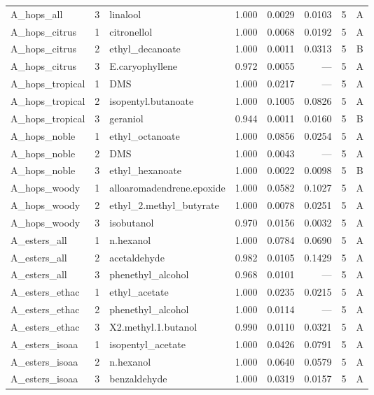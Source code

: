 \begin{longtable}{@{}p{} r p{} r r r r c@{}}
A\_hops\_all & 3 & linalool & 1.000 & 0.0029 & 0.0103 & 5 & A \\
A\_hops\_citrus & 1 & citronellol & 1.000 & 0.0068 & 0.0192 & 5 & A \\
A\_hops\_citrus & 2 & ethyl\_decanoate & 1.000 & 0.0011 & 0.0313 & 5 & B \\
A\_hops\_citrus & 3 & E.\allowbreak{}caryophyllene & 0.972 & 0.0055 & --- & 5 & A \\
A\_hops\_tropical & 1 & DMS & 1.000 & 0.0217 & --- & 5 & A \\
A\_hops\_tropical & 2 & isopentyl.\allowbreak{}butanoate & 1.000 & 0.1005 & 0.0826 & 5 & A \\
A\_hops\_tropical & 3 & geraniol & 0.944 & 0.0011 & 0.0160 & 5 & B \\
A\_hops\_noble & 1 & ethyl\_octanoate & 1.000 & 0.0856 & 0.0254 & 5 & A \\
A\_hops\_noble & 2 & DMS & 1.000 & 0.0043 & --- & 5 & A \\
A\_hops\_noble & 3 & ethyl\_hexanoate & 1.000 & 0.0022 & 0.0098 & 5 & B \\
A\_hops\_woody & 1 & alloaromadendrene.\allowbreak{}epoxide & 1.000 & 0.0582 & 0.1027 & 5 & A \\
A\_hops\_woody & 2 & ethyl\_2.\allowbreak{}methyl\_butyrate & 1.000 & 0.0078 & 0.0251 & 5 & A \\
A\_hops\_woody & 3 & isobutanol & 0.970 & 0.0156 & 0.0032 & 5 & A \\
A\_esters\_all & 1 & n.\allowbreak{}hexanol & 1.000 & 0.0784 & 0.0690 & 5 & A \\
A\_esters\_all & 2 & acetaldehyde & 0.982 & 0.0105 & 0.1429 & 5 & A \\
A\_esters\_all & 3 & phenethyl\_alcohol & 0.968 & 0.0101 & --- & 5 & A \\
A\_esters\_ethac & 1 & ethyl\_acetate & 1.000 & 0.0235 & 0.0215 & 5 & A \\
A\_esters\_ethac & 2 & phenethyl\_alcohol & 1.000 & 0.0114 & --- & 5 & A \\
A\_esters\_ethac & 3 & X2.\allowbreak{}methyl.\allowbreak{}1.\allowbreak{}butanol & 0.990 & 0.0110 & 0.0321 & 5 & A \\
A\_esters\_isoaa & 1 & isopentyl\_acetate & 1.000 & 0.0426 & 0.0791 & 5 & A \\
A\_esters\_isoaa & 2 & n.\allowbreak{}hexanol & 1.000 & 0.0640 & 0.0579 & 5 & A \\
A\_esters\_isoaa & 3 & benzaldehyde & 1.000 & 0.0319 & 0.0157 & 5 & A \\

\end{longtable}

